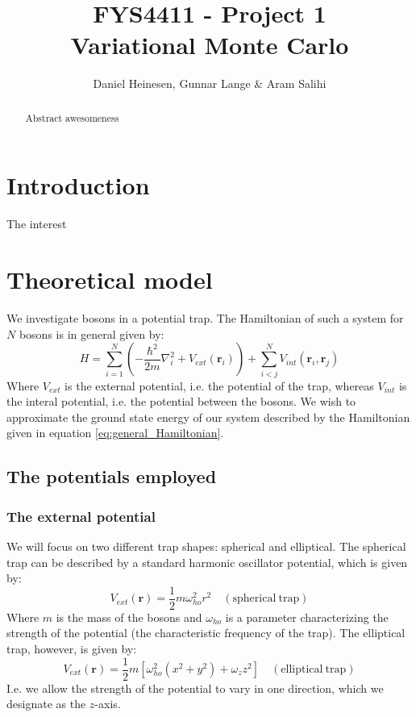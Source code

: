 \documentclass[a4paper, 10pt]{article}
\title{FYS4411 - Project 1\\
Variational Monte Carlo}
\author{Daniel Heinesen, Gunnar Lange \& \tiny Aram Salihi}
\begin{document}
\maketitle
\begin{abstract}
Abstract awesomeness
\end{abstract}
\tableofcontents
\section{Introduction}
The interest

\section{Theoretical model}
We investigate bosons in a potential trap. The Hamiltonian of such a system for $N$ bosons is in general given by:
\begin{equation} \label{eq:general_Hamiltonian}
H=\sum_{i=1}^N\left(-\frac{\hbar^2}{2m}\nabla_i^2 +V_{ext}(\boldsymbol{r}_i)\right)+\sum_{i<j}^N V_{int}(\boldsymbol{r}_i, \boldsymbol{r}_j)
\end{equation}
Where $V_{ext}$ is the external potential, i.e. the potential of the trap, whereas $V_{int}$ is the interal potential, i.e. the potential between the bosons. We wish to approximate the ground state energy of our system described by the Hamiltonian given in equation \ref{eq:general_Hamiltonian}.
\subsection{The potentials employed}
\subsubsection{The external potential}
We will focus on two different trap shapes: spherical and elliptical. The spherical trap can be described by a standard harmonic oscillator potential, which is given by:
\begin{equation}
V_{ext}(\boldsymbol{r})=\frac{1}{2}m\omega_{ho}^2 r^2 \quad \mathrm{(spherical\  trap)}
\end{equation}
Where $m$ is the mass of the bosons and $\omega_{ho}$ is a parameter characterizing the strength of the potential (the characteristic frequency of the trap). The elliptical trap, however, is given by:
\begin{equation}
V_{ext}(\boldsymbol{r})=\frac{1}{2}m[\omega_{ho}^2 (x^2+y^2)+\omega_z z^2] \quad \mathrm{(elliptical\  trap)}
\end{equation}
I.e. we allow the strength of the potential to vary in one direction, which we designate as the $z$-axis.
\end{document}
